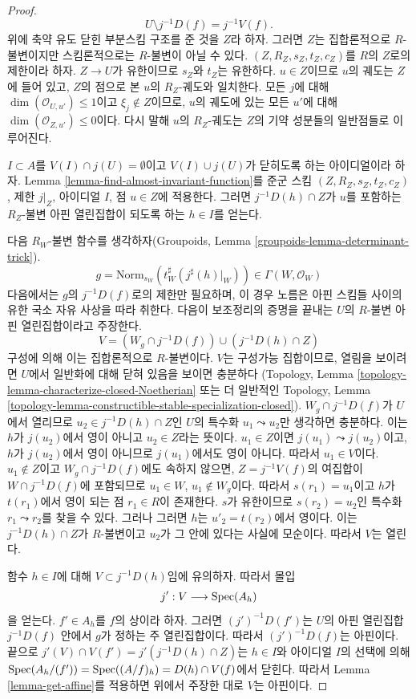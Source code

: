 \begin{proof}
\medskip\noindent
$$
U \setminus j^{-1}D(f) = j^{-1}V(f).
$$
위에 축약 유도 닫힌 부분스킴 구조를 준 것을 $Z$라 하자. 그러면 $Z$는
집합론적으로 $R$-불변이지만 스킴론적으로는 $R$-불변이 아닐 수 있다.
$(Z, R_Z, s_Z, t_Z, c_Z)$를 $R$의 $Z$로의 제한이라 하자. $Z \to U$가
유한이므로 $s_Z$와 $t_Z$는 유한하다. $u \in Z$이므로 $u$의 궤도는 $Z$에
들어 있고, $Z$의 점으로 본 $u$의 $R_Z$-궤도와 일치한다. 모든 $j$에 대해
$\dim(\mathcal{O}_{U, u'}) \leq 1$이고 $\xi_j \not \in Z$이므로, $u$의
궤도에 있는 모든 $u'$에 대해 $\dim(\mathcal{O}_{Z, u'}) \leq 0$이다.
다시 말해 $u$의 $R_Z$-궤도는 $Z$의 기약 성분들의 일반점들로 이루어진다.

\medskip\noindent
$I \subset A$를 $V(I) \cap j(U) =\emptyset$이고 $V(I) \cup j(U)$가
닫히도록 하는 아이디얼이라 하자. Lemma
\ref{lemma-find-almost-invariant-function}를 준군 스킴
$(Z, R_Z, s_Z, t_Z, c_Z)$, 제한 $j|_Z$, 아이디얼 $I$, 점 $u \in Z$에
적용한다. 그러면 $j^{-1}D(h) \cap Z$가 $u$를 포함하는 $R_Z$-불변 아핀
열린집합이 되도록 하는 $h \in I$를 얻는다.

\medskip\noindent
다음 $R_W$-불변 함수를 생각하자(Groupoids, Lemma
\ref{groupoids-lemma-determinant-trick}).
$$
g = 
\text{Norm}_{s_W}(t_W^\sharp(j^\sharp(h)|_W)) \in \Gamma(W, \mathcal{O}_W)
$$
다음에서는 $g$의 $j^{-1}D(f)$로의 제한만 필요하며, 이 경우 노름은 아핀
스킴들 사이의 유한 국소 자유 사상을 따라 취한다. 다음이 보조정리의 증명을
끝내는 $U$의 $R$-불변 아핀 열린집합이라고 주장한다.
$$
V = (W_g \cap j^{-1}D(f)) \cup (j^{-1}D(h) \cap Z)
$$
구성에 의해 이는 집합론적으로 $R$-불변이다. $V$는 구성가능 집합이므로,
열림을 보이려면 $U$에서 일반화에 대해 닫혀 있음을 보이면 충분하다
(Topology, Lemma \ref{topology-lemma-characterize-closed-Noetherian} 또는 더
일반적인 Topology, Lemma
\ref{topology-lemma-constructible-stable-specialization-closed}).
$W_g \cap j^{-1}D(f)$가 $U$에서 열리므로
$u_2 \in j^{-1}D(h) \cap Z$인 $U$의 특수화 $u_1 \leadsto u_2$만 생각하면
충분하다. 이는 $h$가 $j(u_2)$에서 영이 아니고 $u_2 \in Z$라는 뜻이다.
$u_1 \in Z$이면 $j(u_1) \leadsto j(u_2)$이고, $h$가 $j(u_2)$에서 영이
아니므로 $j(u_1)$에서도 영이 아니다. 따라서 $u_1 \in V$이다.
$u_1 \not \in Z$이고 $W_g \cap j^{-1}D(f)$에도 속하지 않으면,
$Z = j^{-1}V(f)$의 여집합이 $W \cap j^{-1}D(f)$에 포함되므로
$u_1 \in W$, $u_1 \not \in W_g$이다. 따라서 $s(r_1) = u_1$이고
$h$가 $t(r_1)$에서 영이 되는 점 $r_1 \in R$이 존재한다. $s$가 유한이므로
$s(r_2) = u_2$인 특수화 $r_1 \leadsto r_2$를 찾을 수 있다. 그러나 그러면
$h$는 $u'_2 = t(r_2)$에서 영이다. 이는 $j^{-1}D(h) \cap Z$가 $R$-불변이고
$u_2$가 그 안에 있다는 사실에 모순이다. 따라서 $V$는 열린다.

\medskip\noindent
함수 $h \in I$에 대해 $V \subset j^{-1}D(h)$임에 유의하자. 따라서 몰입
$$
j' : V \longrightarrow \mathop{\mathrm{Spec}}(A_h)
$$
을 얻는다. $f' \in A_h$를 $f$의 상이라 하자. 그러면
$(j')^{-1}D(f')$는 $U$의 아핀 열린집합 $j^{-1}D(f)$ 안에서 $g$가 정하는
주 열린집합이다. 따라서 $(j')^{-1}D(f)$는 아핀이다. 끝으로
$j'(V) \cap V(f') = j'(j^{-1}D(h) \cap Z)$는 $h \in I$와 아이디얼 $I$의
선택에 의해
$\mathop{\mathrm{Spec}}(A_h/(f')) = \mathop{\mathrm{Spec}}((A/f)_h) = D(h) \cap V(f)$에서 닫힌다.
따라서 Lemma \ref{lemma-get-affine}를 적용하면 위에서 주장한 대로 $V$는
아핀이다.
\end{proof}

